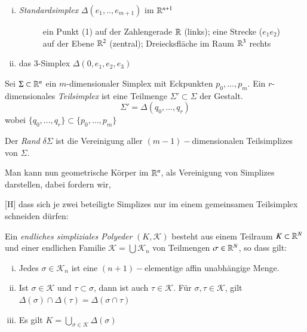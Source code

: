 \documentclass[a4paper,10pt]{scrartcl}
\begin{document}
\begin{exs*}
 \begin{enumerate}[(i)]
  \item \emph{Standardsimplex} $\Delta(e_1,.., e_{m+1})$ im $\mathbb{R}^{n+1}$
 \begin{figure}[H]
 \centering
\fixme[fig119]
\caption{ein Punkt (1) auf der Zahlengerade $\mathbb{R}$ (links); eine Strecke ($e_1e_2$) auf der Ebene $\mathbb{R}^2$ (zentral); Dreiecksfläche im Raum $\mathbb{R}^3$ rechts}
\end{figure} 
\item das $3$-Simplex $\Delta(0, e_1, e_2, e_3)$
 \begin{figure}[H]
 \centering
\fixme[fig120]
\caption{}
\end{figure}
 \end{enumerate}
\end{exs*}
\begin{df}
 Sei $\Sigma\subset \mathbb{R}^n$ ein $m$-dimensionaler Simplex mit Eckpunkten $p_0, \dotsc  , p_m$. 
Ein $r$-dimensionales \emph{Teilsimplex} ist eine Teilmenge $\Sigma'\subset \Sigma$ der Gestalt.
\[
 \Sigma'=\Delta(q_0,\dotsc  , q_r)
\]
wobei $\{q_0,\dotsc  , q_r\}\subset\{p_0,\dotsc  , p_m\}$

Der \emph{Rand} $\delta \Sigma$ ist die Vereinigung aller $(m-1)-$dimensionalen Teilsimplizes von $\Sigma$.
 \begin{figure}[H]
 \centering
\fixme[fig121]
\caption{}
\end{figure}
Man kann nun geometrische Körper im $\mathbb{R}^n$, als Vereinigung von Simplizes darstellen, dabei fordern wir, 
 \begin{figure}[H]
 \centering
\fixme[fig122]
\caption{}
\end{figure}[H]
dass sich je zwei beteiligte Simplizes nur im einem gemeinsamen Teilsimplex schneiden dürfen:
 \begin{figure}[H]
 \centering
\fixme[fig123]
\caption{}
\end{figure}
\end{df}
\begin{df}
 Ein \emph{endliches simpliziales Polyeder} $(K, \mathcal{K})$ besteht aus einem Teilraum $K\subset \mathbb{R}^N$ und einer endlichen Familie $\mathcal K=\bigcup \mathcal K_n$ von Teilmengen $\sigma\in \mathbb{R}^N$, so dass gilt:
\begin{enumerate}[(i)]
 \item Jedes $\sigma\in \mathcal K_n$ ist eine $(n+1)-$elementige affin unabhängige Menge.
 \item Ist $\sigma \in \mathcal K$ und $\tau \subset \sigma$, dann ist auch $\tau \in \mathcal K$. Für $\sigma, \tau \in \mathcal K$, gilt $\Delta(\sigma)\cap \Delta(\tau)=\Delta(\sigma\cap\tau)$
 \item Es gilt $K=\bigcup_{\sigma\in \mathcal K}  \Delta(\sigma)$ 
\end{enumerate}

\end{df}
\end{document}
